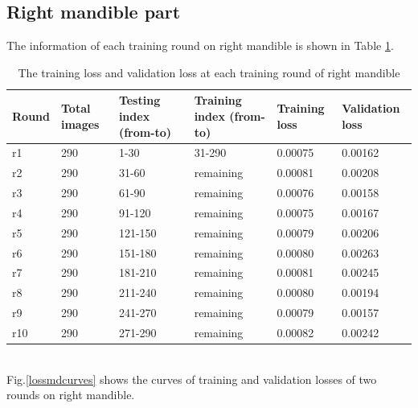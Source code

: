\documentclass[12pt,a4paper]{article}
\begin{document}
\subsection{Right mandible part}
The information of each training round on right mandible is shown in Table \ref{mdloss}.
\begin{table}[h!]
	\centering
	\begin{tabular}{l p{2cm} p{2.4cm} p{2.6cm} p{2.2cm} p{2.2cm}}
	Round & Total images & Testing index (from-to) & Training index (from-to) & Training loss & Validation loss \\ \hline
	r1 & 290 & 1-30 & 31-290 & 0.00075 & 0.00162 \\ \hline
	r2 & 290 & 31-60 & remaining & 0.00081 & 0.00208 \\ \hline
	r3 & 290 & 61-90 & remaining & 0.00076 & 0.00158 \\ \hline
	r4 & 290 & 91-120 & remaining & 0.00075 & 0.00167 \\ \hline
	r5 & 290 & 121-150 & remaining & 0.00079 & 0.00206 \\ \hline
	r6 & 290 & 151-180 & remaining & 0.00080 & 0.00263 \\ \hline
	r7 & 290 & 181-210 & remaining & 0.00081 & 0.00245 \\ \hline
	r8 & 290 & 211-240 & remaining & 0.00080 & 0.00194 \\ \hline
	r9 & 290 & 241-270 & remaining & 0.00079 & 0.00157 \\ \hline	
	r10 & 290 & 271-290 & remaining & 0.00082 & 0.00242 \\ \hline
	\end{tabular}
	\caption{The training loss and validation loss at each training round of right mandible}
	\label{mdloss}
\end{table}~\\
Fig.\ref{lossmdcurves} shows the curves of training and validation losses of two rounds on right mandible.
\end{document}
